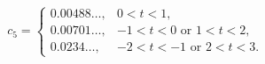 \[c_{5}=\begin{cases}0.00488\ldots,&0<t<1,\\
0.00701\ldots,&-1<t<0\mbox{ or }1<t<2,\\
0.0234\ldots,&-2<t<-1\mbox{ or }2<t<3.\end{cases}\]